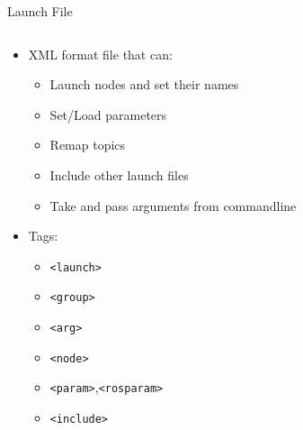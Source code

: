 \documentclass[aspectratio=43]{beamer}
\newcommand{\inline}[1]{\texttt{#1}}
\begin{document}
\begin{frame}{Launch File}
	\begin{columns}
		\begin{column}{0.6\textwidth}
			\begin{itemize}
				\item XML format file that can:
					\begin{itemize}
						\item Launch nodes and set their names
						\item Set/Load parameters
						\item Remap topics
						\item Include other launch files
						\item Take and pass arguments from commandline
					\end{itemize}
				\item Tags:
					\begin{itemize}
						\item \inline{<launch>}
						\item \inline{<group>}
						\item \inline{<arg>}
						\item \inline{<node>}
						\item \inline{<param>},\inline{<rosparam>}
						\item \inline{<include>}
					\end{itemize}
			\end{itemize}
		\end{column}
	\begin{column}{0.4\textwidth}
		\centering
		\end{column}
	\end{columns}
\end{frame}
\end{document}
